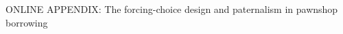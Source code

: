
\setcounter{table}{0}
\setcounter{figure}{0}
\setcounter{section}{0}
\renewcommand\thefigure{OA-\arabic{figure}}
\renewcommand\thetable{OA-\arabic{table}}
\renewcommand*{\thepage}{OA - \arabic{page}}
\renewcommand\thesection{Appendix \Alph{section}.}
\renewcommand\thesubsection{\Alph{section}.\arabic{subsection}}

\begin{center}
	\Large ONLINE APPENDIX: The forcing-choice design and paternalism in pawnshop borrowing \\[0.5em]
	\large \author{Craig McIntosh \and Isaac Meza \and Joyce Sadka \and Enrique Seira \and Francis J.\ DiTraglia}
\end{center}


